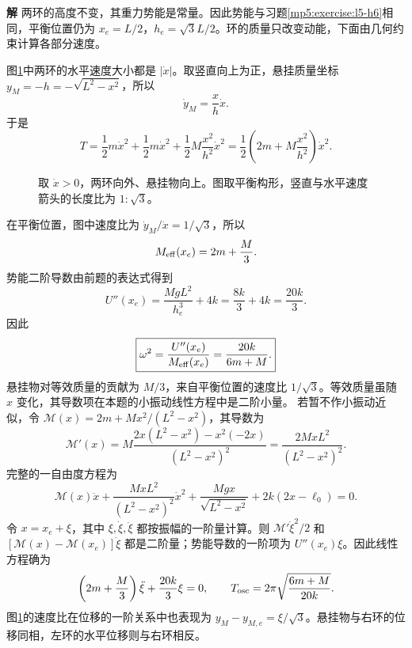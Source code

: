 \documentclass[11pt,openany,fontset=fandol]{ctexbook}
\theoremstyle{definition}\newtheorem{example}{例}[chapter]\newtheorem{exercise}{习题}[chapter]
\newcommand{\SolutionStart}{\par\medskip\ifdim\pagetotal>0pt\ifdim\dimexpr\pagegoal-\pagetotal\relax<3\baselineskip\newpage\fi\fi\noindent\textbf{解}\quad\ignorespaces}
\newenvironment{solution}{\SolutionStart}{\par\medskip}
\begin{document}
\begin{solution}
两环的高度不变，其重力势能是常量。因此势能与习题\ref{mp5:exercise:l5-h6}相同，平衡位置仍为 $x_e=L/2$，$h_e=\sqrt3L/2$。环的质量只改变动能，下面由几何约束计算各部分速度。

图\ref{mp5:fig:l5-h11-s}中两环的水平速度大小都是 $|\dot x|$。取竖直向上为正，悬挂质量坐标 $y_M=-h=-\sqrt{L^2-x^2}$，所以
\[
\dot y_M=\frac xh\dot x.
\]
于是
\[
T=\frac12m\dot x^2+\frac12m\dot x^2
+\frac12M\frac{x^2}{h^2}\dot x^2
=\frac12\left(2m+M\frac{x^2}{h^2}\right)\dot x^2.
\]

\begin{figure}[H]\centering
{}
\caption{取 $\dot x>0$，两环向外、悬挂物向上。图取平衡构形，竖直与水平速度箭头的长度比为 $1:\sqrt3$。}\label{mp5:fig:l5-h11-s}
\end{figure}

在平衡位置，图中速度比为 $\dot y_M/\dot x=1/\sqrt3$，所以
\[
M_{\rm eff}(x_e)=2m+\frac M3.
\]
势能二阶导数由前题的表达式得到
\[
U''(x_e)=\frac{MgL^2}{h_e^3}+4k
=\frac{8k}3+4k=\frac{20k}3.
\]
因此
\[
\boxed{\omega^2=\frac{U''(x_e)}{M_{\rm eff}(x_e)}
=\frac{20k}{6m+M}.}
\]
悬挂物对等效质量的贡献为 $M/3$，来自平衡位置的速度比 $1/\sqrt3$。等效质量虽随 $x$ 变化，其导数项在本题的小振动线性方程中是二阶小量。
若暂不作小振动近似，令 $\mathcal M(x)=2m+Mx^2/(L^2-x^2)$，其导数为
\[
\mathcal M'(x)=M\frac{2x(L^2-x^2)-x^2(-2x)}{(L^2-x^2)^2}
=\frac{2MxL^2}{(L^2-x^2)^2}.
\]
完整的一自由度方程为
\[
\mathcal M(x)\ddot x+\frac{MxL^2}{(L^2-x^2)^2}\dot x^2
+\frac{Mgx}{\sqrt{L^2-x^2}}+2k(2x-\ell_0)=0.
\]
令 $x=x_e+\xi$，其中 $\xi,\dot\xi,\ddot\xi$ 都按振幅的一阶量计算。则 $\mathcal M'\dot\xi^2/2$ 和 $[\mathcal M(x)-\mathcal M(x_e)]\ddot\xi$ 都是二阶量；势能导数的一阶项为 $U''(x_e)\xi$。因此线性方程确为
\[
\left(2m+\frac M3\right)\ddot\xi+\frac{20k}{3}\xi=0,
\qquad T_{\rm osc}=2\pi\sqrt{\frac{6m+M}{20k}}.
\]
图\ref{mp5:fig:l5-h11-s}的速度比在位移的一阶关系中也表现为 $y_M-y_{M,e}=\xi/\sqrt3$。悬挂物与右环的位移同相，左环的水平位移则与右环相反。

\end{solution}
\end{document}
